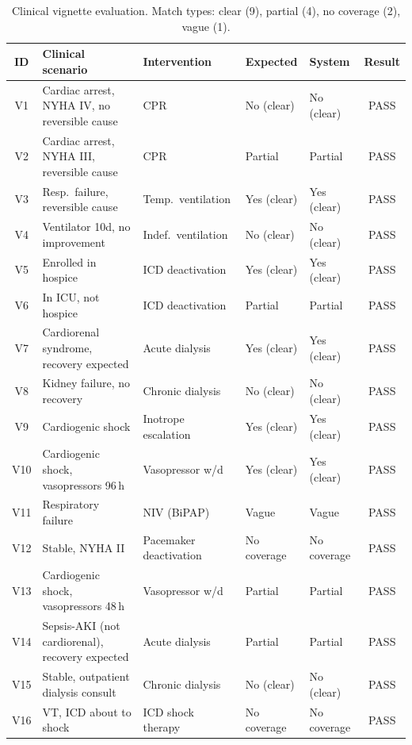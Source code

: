 \documentclass[10pt]{article}
\begin{document}
\begin{table}[ht]
\centering
\caption{Clinical vignette evaluation. Match types: clear (9), partial (4), no coverage (2), vague (1).}
\label{tab:vignettes}
\scriptsize
\begin{tabularx}{\textwidth}{c L{4.6cm} L{2.4cm} L{1.8cm} L{1.8cm} c}
\toprule
\textbf{ID} & \textbf{Clinical scenario} & \textbf{Intervention} & \textbf{Expected} & \textbf{System} & \textbf{Result} \\
\midrule
V1 & Cardiac arrest, NYHA IV, no reversible cause & CPR & No (clear) & No (clear) & PASS \\
V2 & Cardiac arrest, NYHA III, reversible cause & CPR & Partial & Partial & PASS \\
V3 & Resp.\ failure, reversible cause & Temp.\ ventilation & Yes (clear) & Yes (clear) & PASS \\
V4 & Ventilator 10d, no improvement & Indef.\ ventilation & No (clear) & No (clear) & PASS \\
V5 & Enrolled in hospice & ICD deactivation & Yes (clear) & Yes (clear) & PASS \\
V6 & In ICU, not hospice & ICD deactivation & Partial & Partial & PASS \\
V7 & Cardiorenal syndrome, recovery expected & Acute dialysis & Yes (clear) & Yes (clear) & PASS \\
V8 & Kidney failure, no recovery & Chronic dialysis & No (clear) & No (clear) & PASS \\
V9 & Cardiogenic shock & Inotrope escalation & Yes (clear) & Yes (clear) & PASS \\
V10 & Cardiogenic shock, vasopressors 96\,h & Vasopressor w/d & Yes (clear) & Yes (clear) & PASS \\
V11 & Respiratory failure & NIV (BiPAP) & Vague & Vague & PASS \\
V12 & Stable, NYHA II & Pacemaker deactivation & No coverage & No coverage & PASS \\
V13 & Cardiogenic shock, vasopressors 48\,h & Vasopressor w/d & Partial & Partial & PASS \\
V14 & Sepsis-AKI (not cardiorenal), recovery expected & Acute dialysis & Partial & Partial & PASS \\
V15 & Stable, outpatient dialysis consult & Chronic dialysis & No (clear) & No (clear) & PASS \\
V16 & VT, ICD about to shock & ICD shock therapy & No coverage & No coverage & PASS \\
\bottomrule
\end{tabularx}
\end{table}
\end{document}
